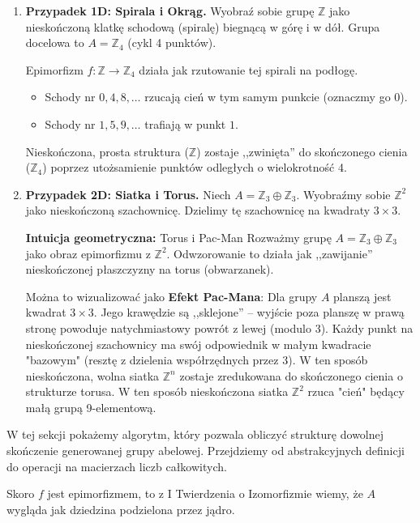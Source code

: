 \begin{eg}
    \begin{enumerate}[label=\alph*)]
        \item \textbf{Przypadek 1D: Spirala i Okrąg.}
        Wyobraź sobie grupę $\mathbb{Z}$ jako nieskończoną klatkę schodową (spiralę) biegnącą w górę i w dół.
        Grupa docelowa to $A = \mathbb{Z}_4$ (cykl 4 punktów).
        
        Epimorfizm $f: \mathbb{Z} \to \mathbb{Z}_4$ działa jak rzutowanie tej spirali na podłogę.
        \begin{itemize}
            \item Schody nr $0, 4, 8, \ldots$ rzucają cień w tym samym punkcie (oznaczmy go $0$).
            \item Schody nr $1, 5, 9, \ldots$ trafiają w punkt $1$.
        \end{itemize}
        Nieskończona, prosta struktura ($\mathbb{Z}$) zostaje ,,zwinięta'' do skończonego cienia ($\mathbb{Z}_4$) poprzez utożsamienie punktów odległych o wielokrotność 4.
        
        \item \textbf{Przypadek 2D: Siatka i Torus.}
        Niech $A = \mathbb{Z}_3 \oplus \mathbb{Z}_3$. Wyobraźmy sobie $\mathbb{Z}^2$ jako nieskończoną szachownicę.
        Dzielimy tę szachownicę na kwadraty $3 \times 3$.
	
	\textbf{Intuicja geometryczna:} Torus i Pac-Man
    	Rozważmy grupę $A = \mathbb{Z}_3 \oplus \mathbb{Z}_3$ jako obraz epimorfizmu z $\mathbb{Z}^2$.
    		Odwzorowanie to działa jak ,,zawijanie'' nieskończonej płaszczyzny na torus (obwarzanek).
    
    		Można to wizualizować jako \textbf{Efekt Pac-Mana}:
    		Dla grupy $A$ planszą jest kwadrat $3 \times 3$. Jego krawędzie są ,,sklejone'' – wyjście poza planszę w prawą stronę powoduje natychmiastowy powrót z lewej (modulo 3).
        Każdy punkt na nieskończonej szachownicy ma swój odpowiednik w małym kwadracie "bazowym" (resztę z dzielenia współrzędnych przez 3).
    		W ten sposób nieskończona, wolna siatka $\mathbb{Z}^n$ zostaje zredukowana do skończonego cienia o strukturze torusa.
        W ten sposób nieskończona siatka $\mathbb{Z}^2$ rzuca "cień" będący małą grupą 9-elementową.
	
    \end{enumerate}
\end{eg}

\begin{context}
    W tej sekcji pokażemy algorytm, który pozwala obliczyć strukturę dowolnej skończenie generowanej grupy abelowej. Przejdziemy od abstrakcyjnych definicji do operacji na macierzach liczb całkowitych.
\end{context}
Skoro $f$ jest epimorfizmem, to z I Twierdzenia o Izomorfizmie wiemy, że $A$ wygląda jak dziedzina podzielona przez jądro.


